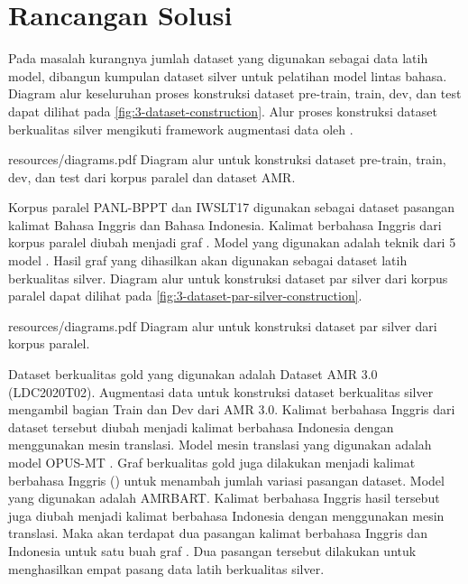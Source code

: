 \section{Rancangan Solusi}

Pada masalah kurangnya jumlah dataset yang digunakan sebagai data latih model, dibangun kumpulan dataset silver untuk pelatihan model \amrparsing{} lintas bahasa.
Diagram alur keseluruhan proses konstruksi dataset pre-train, train, dev, dan test dapat dilihat pada \cref{fig:3-dataset-construction}.
Alur proses konstruksi dataset berkualitas silver mengikuti framework augmentasi data oleh \textcite{lee2022}.

  {resources/diagrams.pdf}
  {Diagram alur untuk konstruksi dataset pre-train, train, dev, dan test dari korpus paralel dan dataset AMR.}

Korpus paralel PANL-BPPT dan IWSLT17 digunakan sebagai dataset pasangan kalimat Bahasa Inggris dan Bahasa Indonesia.
Kalimat berbahasa Inggris dari korpus paralel diubah menjadi graf \AMR{}.
Model \amrparsing{} yang digunakan adalah teknik  dari 5 model \sota{} .
Hasil graf \AMR{} yang dihasilkan akan digunakan sebagai dataset latih berkualitas silver.
Diagram alur untuk konstruksi dataset par silver dari korpus paralel dapat dilihat pada \cref{fig:3-dataset-par-silver-construction}.

  {resources/diagrams.pdf}
  {Diagram alur untuk konstruksi dataset par silver dari korpus paralel.}

Dataset \AMR{} berkualitas gold yang digunakan adalah Dataset AMR 3.0 (LDC2020T02).
Augmentasi data untuk konstruksi dataset berkualitas silver mengambil bagian Train dan Dev  dari AMR 3.0.
Kalimat berbahasa Inggris dari dataset \AMR{} tersebut diubah menjadi kalimat berbahasa Indonesia dengan menggunakan mesin translasi.
Model mesin translasi yang digunakan adalah model {OPUS-MT} .
Graf \AMR{} berkualitas gold juga dilakukan  menjadi kalimat berbahasa Inggris (\AMRtoTEXT{}) untuk menambah jumlah variasi pasangan dataset.
Model \AMRtoTEXT{} yang digunakan adalah \gls{AMRBART}.
Kalimat berbahasa Inggris hasil  tersebut juga diubah menjadi kalimat berbahasa Indonesia dengan menggunakan mesin translasi.
Maka akan terdapat dua pasangan kalimat berbahasa Inggris dan Indonesia untuk satu buah graf \AMR{}.
Dua pasangan tersebut dilakukan  untuk menghasilkan empat pasang data latih berkualitas silver.

